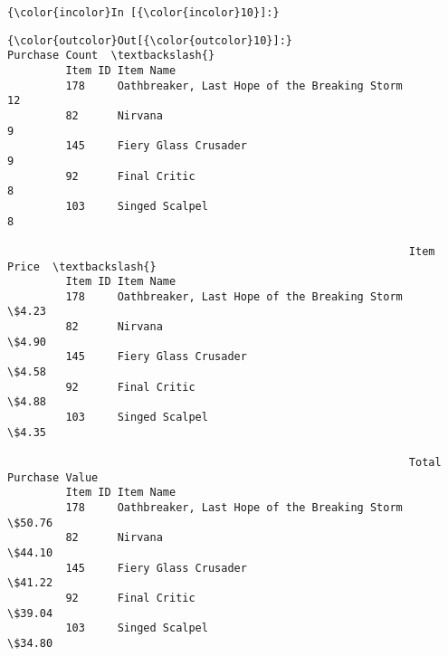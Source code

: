 \documentclass[11pt]{article}
\begin{document}
    \begin{Verbatim}[commandchars=\\\{\}]
{\color{incolor}In [{\color{incolor}10}]:} 
\end{Verbatim}


\begin{Verbatim}[commandchars=\\\{\}]
{\color{outcolor}Out[{\color{outcolor}10}]:}                                                      Purchase Count  \textbackslash{}
         Item ID Item Name                                                     
         178     Oathbreaker, Last Hope of the Breaking Storm             12   
         82      Nirvana                                                   9   
         145     Fiery Glass Crusader                                      9   
         92      Final Critic                                              8   
         103     Singed Scalpel                                            8   
         
                                                              Item Price  \textbackslash{}
         Item ID Item Name                                                 
         178     Oathbreaker, Last Hope of the Breaking Storm      \$4.23   
         82      Nirvana                                           \$4.90   
         145     Fiery Glass Crusader                              \$4.58   
         92      Final Critic                                      \$4.88   
         103     Singed Scalpel                                    \$4.35   
         
                                                              Total Purchase Value  
         Item ID Item Name                                                          
         178     Oathbreaker, Last Hope of the Breaking Storm               \$50.76  
         82      Nirvana                                                    \$44.10  
         145     Fiery Glass Crusader                                       \$41.22  
         92      Final Critic                                               \$39.04  
         103     Singed Scalpel                                             \$34.80  
\end{Verbatim}
            

    
    
    
    
\end{document}

